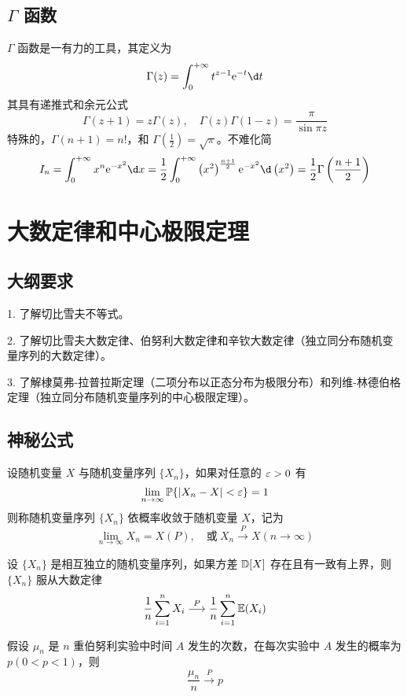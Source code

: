 \subsection{\texorpdfstring{$\Gamma$ 函数}{Γ 函数}}

$\Gamma$ 函数是一有力的工具，其定义为
\[ \Gamma(z) = \int_{0}^{+\infty} t^{z-1} \ee^{-t} \d t \]
其具有递推式和余元公式
\[ \Gamma(z + 1) = z \Gamma(z), \quad \Gamma(z) \Gamma(1-z) = \frac{\pi}{\sin \pi z} \]
特殊的，$\Gamma(n + 1) = n!$，和 $\Gamma(\frac{1}{2}) = \sqrt{\pi}$。不难化简
\[ I_n = \int_{0}^{+\infty} x^n \ee^{-x^2} \d x = \frac{1}{2} \int_{0}^{+\infty} \left(x^2\right)^{\frac{n+1}{2}} \ee^{-x^2} \d \left(x^2\right) = \frac{1}{2} \Gamma\left(\frac{n+1}{2}\right)  \]

\section{大数定律和中心极限定理}

\subsection{大纲要求}

1. 了解切比雪夫不等式。

2. 了解切比雪夫大数定律、伯努利大数定律和辛钦大数定律（独立同分布随机变量序列的大数定律）。

3. 了解棣莫弗-拉普拉斯定理（二项分布以正态分布为极限分布）和列维-林德伯格定理（独立同分布随机变量序列的中心极限定理）。

\subsection{神秘公式}

设随机变量 $X$ 与随机变量序列 $\{X_n\}$，如果对任意的 $\varepsilon > 0$ 有
\[ \lim_{n \to \infty} \mathbb{P}\{|X_n - X| < \varepsilon \} =1 \]
则称随机变量序列 $\{X_n\}$ 依概率收敛于随机变量 $X$，记为
\[ \lim_{n \to \infty} X_n = X(P), \quad \text{或}\ X_n \stackrel{P}{\longrightarrow} X(n \to \infty) \]

\begin{theorem}[切比雪夫大数定律]
	设 $\{X_n\}$ 是相互独立的随机变量序列，如果方差 $\mathbb{D} [X]$ 存在且有一致有上界，则 $\{X_n\}$ 服从大数定律
	\[ \frac{1}{n} \sum_{i=1}^n X_i \stackrel{P}{\longrightarrow} \frac{1}{n} \sum_{i=1}^n \mathbb{E}(X_i) \]
\end{theorem}

\begin{theorem}[伯努利大数定律]
	假设 $\mu_n$ 是 $n$ 重伯努利实验中时间 $A$ 发生的次数，在每次实验中 $A$ 发生的概率为 $p(0 < p < 1)$，则
	\[ \frac{\mu_n}{n} \stackrel{P}{\longrightarrow} p \]
\end{theorem}

